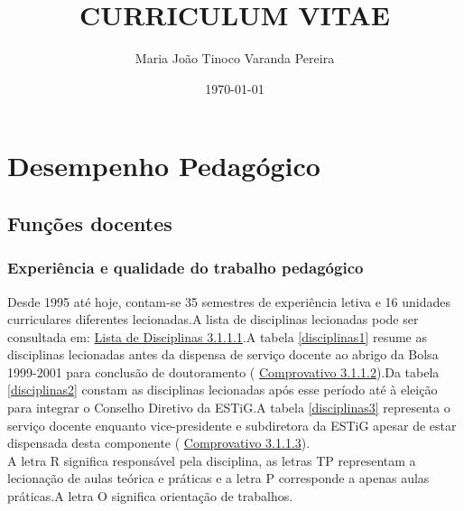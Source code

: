 \documentclass[11pt]{article}
\title{CURRICULUM VITAE \\
 
\vspace{3cm}
\vspace{3cm}}
\author{Maria João Tinoco Varanda Pereira}
\date{
\today}
\begin{document}
 
\maketitle 
\newpage
\section{Desempenho Pedagógico}
\subsection{Funções docentes}
\subsubsection{Experiência e qualidade do trabalho pedagógico}Desde 1995 até hoje, contam-se 35 semestres de experiência letiva e 16 unidades curriculares diferentes lecionadas.A lista de disciplinas lecionadas pode ser consultada em: 
\href{run:Disciplinas/Disciplinas.pdf}{Lista de Disciplinas 3.1.1.1}.A tabela 
\ref{disciplinas1} resume as disciplinas lecionadas antes da dispensa de serviço docente ao abrigo da Bolsa 1999-2001 para conclusão de doutoramento (
\href{run:Bolsas/DispensaProdep.pdf}{Comprovativo 3.1.1.2}).Da tabela 
\ref{disciplinas2} constam as disciplinas lecionadas após esse período até à eleição para integrar o Conselho Diretivo da ESTiG.A tabela 
\ref{disciplinas3} representa o serviço docente enquanto vice-presidente e subdiretora da ESTiG apesar de estar dispensada desta componente (
\href{run:Bolsas/DispensaSubdiretora.pdf}{Comprovativo 3.1.1.3}). \\
A letra R significa responsável pela disciplina, as letras TP representam a lecionação de aulas teórica e práticas e a letra P corresponde a apenas aulas práticas.A letra O significa orientação de trabalhos. 
\end{document}
